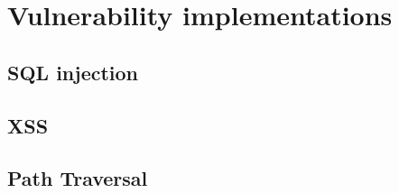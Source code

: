 \chapter{Vulnerability implementations}

\section{SQL injection}\label{appendix:sqli}


\section{XSS}\label{appendix:xss}


\section{Path Traversal}\label{appendix:path_traversal}

